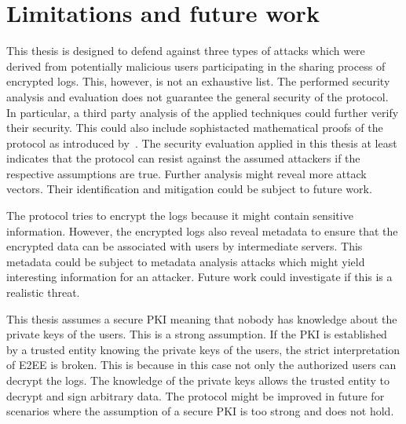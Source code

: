 \documentclass[../main.tex]{subfiles}
\begin{document}
\section{Limitations and future work}
This thesis is designed to defend against three types of attacks which were derived from potentially malicious users participating in the sharing process of encrypted logs.
This, however, is not an exhaustive list.
The performed security analysis and evaluation does not guarantee the general security of the protocol.
In particular, a third party analysis of the applied techniques could further verify their security.
This could also include sophistacted mathematical proofs of the protocol as introduced by~\cite{Katz2020}.   
The security evaluation applied in this thesis at least indicates that the protocol can resist against the assumed attackers if the respective assumptions are true.
Further analysis might reveal more attack vectors.
Their identification and mitigation could be subject to future work.

The protocol tries to encrypt the logs because it might contain sensitive information.
However, the encrypted logs also reveal metadata to ensure that the encrypted data can be associated with users by intermediate servers.
This metadata could be subject to metadata analysis attacks which might yield interesting information for an attacker.
Future work could investigate if this is a realistic threat.

This thesis assumes a secure PKI meaning that nobody has knowledge about the private keys of the users.
This is a strong assumption.
If the PKI is established by a trusted entity knowing the private keys of the users, the strict interpretation of E2EE is broken.
This is because in this case not only the authorized users can decrypt the logs.
The knowledge of the private keys allows the trusted entity to decrypt and sign arbitrary data.
The protocol might be improved in future for scenarios where the assumption of a secure PKI is too strong and does not hold.
\end{document}

